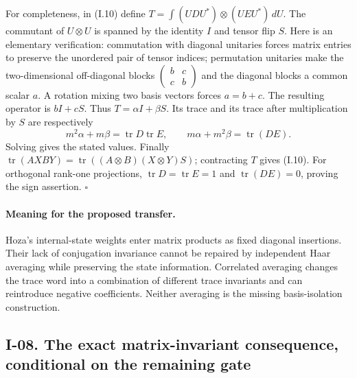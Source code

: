 For completeness, in (I.10) define
$T=\int(UDU^*)\otimes(UEU^*)\,dU$.  The commutant of
$U\otimes U$ is spanned by the identity $I$ and tensor flip $S$.
Here is an elementary verification: commutation with diagonal unitaries
forces matrix entries to preserve the unordered pair of tensor indices;
permutation unitaries make the two-dimensional off-diagonal blocks
$\left(\begin{smallmatrix}b&c\\c&b\end{smallmatrix}\right)$ and
the diagonal blocks a common scalar $a$.  A rotation mixing two basis
vectors forces $a=b+c$.  The resulting operator is $bI+cS$.
Thus $T=\alpha I+\beta S$.  Its trace and its trace after multiplication
by $S$ are respectively
\[
 m^2\alpha+m\beta=\operatorname{tr}D\operatorname{tr}E,
 \qquad m\alpha+m^2\beta=\operatorname{tr}(DE).
\]
Solving gives the stated values.  Finally
$\operatorname{tr}(A X B Y)=
\operatorname{tr}((A\otimes B)(X\otimes Y)S)$;
contracting $T$ gives (I.10).  For orthogonal rank-one projections,
$\operatorname{tr}D=\operatorname{tr}E=1$ and
$\operatorname{tr}(DE)=0$, proving the sign assertion.
\hfill$\square$

\paragraph{Meaning for the proposed transfer.}
Hoza's internal-state weights enter matrix products as fixed
diagonal insertions.  Their lack of conjugation invariance cannot
be repaired by independent Haar averaging while preserving the
state information.  Correlated averaging changes the trace word
into a combination of different trace invariants and can reintroduce
negative coefficients.  Neither averaging is the missing
basis-isolation construction.

\subsection{I-08. The exact matrix-invariant consequence, conditional on the remaining gate}
\label{I-08}

